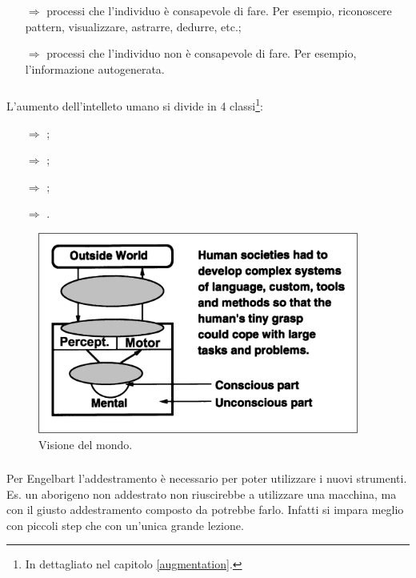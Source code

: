 \begin{itemize}
    \item [$\Rightarrow$]  processi che l'individuo è consapevole di fare. Per 
    esempio, riconoscere pattern, visualizzare, astrarre, dedurre, etc.;
    \item [$\Rightarrow$]  processi che l'individuo non è consapevole di fare. Per esempio,
    l'informazione autogenerata.
\end{itemize}

\subsubsection{}

L'aumento dell'intelleto umano si divide in 4 classi\footnote{In dettagliato nel capitolo \ref{augmentation}.}:

\begin{itemize}
    \item [$\Rightarrow$] ;
    \item [$\Rightarrow$] ;
    \item [$\Rightarrow$] ;
    \item [$\Rightarrow$] .
\end{itemize}

\begin{figure}[h]
    \centering
    \includegraphics[scale=0.5]{images/Mondo.png}
    \caption{Visione del mondo.}
    \label{fig:Engelbart}
\end{figure}

\subsubsection{}

Per Engelbart l'addestramento è necessario per poter utilizzare i nuovi strumenti. Es. 
un aborigeno non addestrato non riuscirebbe a utilizzare una macchina, ma con il giusto addestramento composto da 
potrebbe farlo. Infatti si impara meglio con piccoli step che con un'unica grande lezione.

